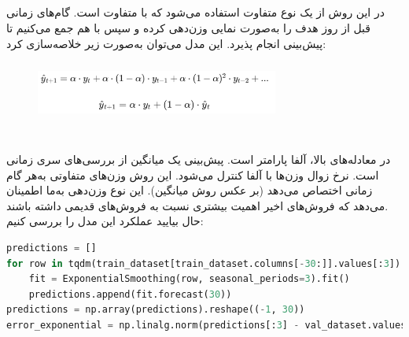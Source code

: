\documentclass{article}
\begin{document}
\subsection*{}
در این روش از یک نوع  متفاوت استفاده می‌شود که با  متفاوت است. گام‌های زمانی قبل از روز هدف را به‌صورت نمایی وزن‌دهی کرده و سپس با هم جمع می‌کنیم تا پیش‌بینی انجام پذیرد. این مدل می‌توان به‌صورت زیر خلاصه‌سازی کرد: 
\begin{figure}[hbt!]
	\centering
	\includegraphics[width=8cm,height=2cm]{Outputs/e4.png}
\end{figure}
\ \\
در معادله‌های بالا، آلفا پارامتر  است. پیش‌بینی   یک میانگین از بررسی‌های سری زمانی است. نرخ زوال وز‌ن‌ها با آلفا کنترل می‌شود. این روش وزن‌های متفاوتی به‌هر گام زمانی اختصاص می‌دهد (بر عکس روش میانگین). این نوع وزن‌دهی به‌ما اطمینان می‌دهد که فروش‌های اخیر اهمیت بیشتری نسبت به فروش‌های قدیمی داشته باشند.\\
حال بیایید عملکرد این مدل را بررسی کنیم:
\begin{latin}
\begin{lstlisting}[language=Python]
predictions = []
for row in tqdm(train_dataset[train_dataset.columns[-30:]].values[:3]):
	fit = ExponentialSmoothing(row, seasonal_periods=3).fit()
	predictions.append(fit.forecast(30))
predictions = np.array(predictions).reshape((-1, 30))
error_exponential = np.linalg.norm(predictions[:3] - val_dataset.values[:3])/len(predictions[0])
\end{lstlisting}
\end{latin}
\end{document}
